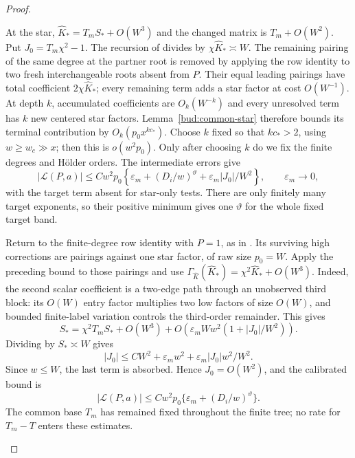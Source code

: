 \begin{proof}
\begin{enumerate}[label=(\roman*)]
At the star, $\widehat K_*=T_mS_*+O(W^3)$ and the changed matrix is
$T_m+O(W^2)$. Put $J_0=T_m\chi^2-1$. The recursion of
\cite[Lemma~4.9]{PE} divides by $\chi\widehat K_*\asymp W$.
The remaining pairing of the same degree at the partner root is removed
by applying the row identity to two fresh interchangeable roots absent
from $P$. Their equal leading pairings have total coefficient
$2\chi\widehat K_*$; every remaining term adds a star factor at cost
$O(W^{-1})$.
At depth $k$, accumulated coefficients are $O_k(W^{-k})$ and every
unresolved term has $k$ new centered star factors. Lemma~\ref{bud:common-star}
therefore bounds its terminal contribution by $O_k(p_0x^{kc_*})$.
Choose $k$ fixed so that $kc_*>2$, using $w\ge w_c\gg x$;
then this is $o(w^2p_0)$. Only after choosing $k$ do we fix the finite
degrees and H\"older orders. The intermediate errors give
\[
 |\mathcal L(P,a)|\le Cw^2p_0
 \left\{\varepsilon_m+(D_i/w)^\vartheta
                    +\varepsilon_m|J_0|/W^2\right\},
 \qquad \varepsilon_m\to0,
\]
with the target term absent for star-only tests. There are only finitely
many target exponents, so their positive minimum gives one $\vartheta$
for the whole fixed target band.

Return to the finite-degree row identity with $P=1$, as in
\cite[Lemma~4.10]{PE}. Its surviving high corrections are pairings
against one star factor, of raw size $p_0=W$. Apply the preceding
bound to those pairings and use
$\Gamma_{\widehat K}(\widehat K_*)=\chi^2\widehat K_*+O(W^3)$.
Indeed, the second scalar coefficient is a two-edge path through an
unobserved third block: its $O(W)$ entry factor multiplies two low
factors of size $O(W)$, and bounded finite-label variation controls
the third-order remainder.
This gives
\[
 S_*=\chi^2T_mS_*+O(W^3)
       +O\!\left(\varepsilon_m Ww^2(1+|J_0|/W^2)\right).
\]
Dividing by $S_*\asymp W$ gives
\[
 |J_0|\le CW^2+\varepsilon_m w^2
                    +\varepsilon_m|J_0|w^2/W^2.
\]
Since $w\le W$, the last term is absorbed. Hence $J_0=O(W^2)$,
and the calibrated bound is
\[
 |\mathcal L(P,a)|\le Cw^2p_0
                \{\varepsilon_m+(D_i/w)^\vartheta\}.
\]
The common base $T_m$ has remained fixed throughout the finite tree;
no rate for $T_m-T$ enters these estimates.


\end{enumerate}
\end{proof}

